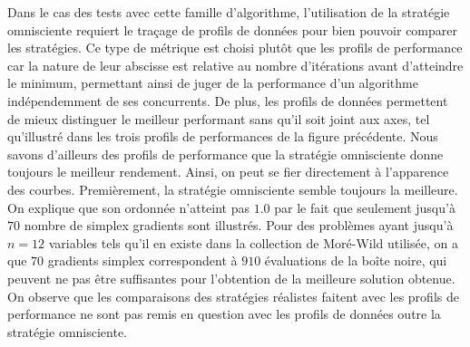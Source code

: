 \documentclass[letterpaper]{scrartcl}
\begin{document}
		Dans le cas des tests avec cette famille d'algorithme, l'utilisation de la stratégie omnisciente requiert le traçage de profils de données pour bien pouvoir comparer les stratégies.  Ce type de métrique est choisi plutôt que les profils de performance car la nature de leur abscisse est relative au nombre d'itérations avant d'atteindre le minimum, permettant ainsi de juger de la performance d'un algorithme indépendemment de ses concurrents. De plus, les profils de données permettent de mieux distinguer le meilleur performant sans qu'il soit joint aux axes, tel qu'illustré dans les trois profils de performances de la figure précédente. Nous savons d'ailleurs des profils de performance que la stratégie omnisciente donne toujours le meilleur rendement. Ainsi, on peut se fier directement à l'apparence des courbes. Premièrement, la stratégie omnisciente semble toujours la meilleure. On explique que son ordonnée n'atteint pas $1.0$ par le fait que seulement jusqu'à $70$ nombre de simplex gradients sont illustrés. Pour des problèmes ayant jusqu'à $n=12$ variables tels qu'il en existe dans la collection de Moré-Wild utilisée, on a que $70$ gradients simplex correspondent à $910$ évaluations de la boîte noire, qui peuvent ne pas être suffisantes pour l'obtention de la meilleure solution obtenue. On observe que les comparaisons des stratégies réalistes faitent avec les profils de performance ne sont pas remis en question avec les profils de données outre la stratégie omnisciente.
		\clearpage
\end{document}
